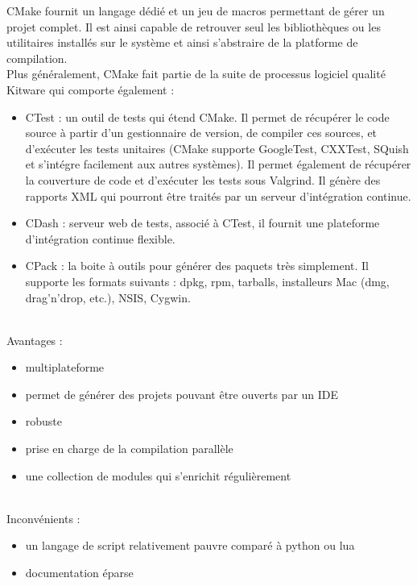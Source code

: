 \documentclass[11pt,twoside,a4paper]{article}
\begin{document}
CMake fournit un langage d{\'e}di{\'e} et un jeu de macros permettant de g{\'e}rer un projet complet. Il est ainsi capable de retrouver seul les biblioth{\`e}ques ou les utilitaires install{\'e}s sur le syst{\`e}me et ainsi s'abstraire de la platforme de compilation.~\\

Plus g{\'e}n{\'e}ralement, CMake fait partie de la suite de processus logiciel qualit{\'e} Kitware qui comporte {\'e}galement :
\begin{itemize}
	\item CTest : un outil de tests qui {\'e}tend CMake. Il permet de r{\'e}cup{\'e}rer le code source {\`a} partir d'un gestionnaire de version, de compiler ces sources, et d'ex{\'e}cuter les tests unitaires (CMake supporte GoogleTest, CXXTest, SQuish et s'int{\'e}gre facilement aux autres syst{\`e}mes). Il permet {\'e}galement de r{\'e}cup{\'e}rer la couverture de code et d'ex{\'e}cuter les tests sous Valgrind. Il g{\'e}n{\`e}re des rapports XML qui pourront {\^e}tre trait{\'e}s par un serveur d'int{\'e}gration continue.
	\item CDash : serveur web de tests, associ{\'e} {\`a} CTest, il fournit une plateforme d'int{\'e}gration continue flexible.
	\item CPack : la boite {\`a} outils pour g{\'e}n{\'e}rer des paquets tr{\`e}s simplement. Il supporte les formats suivants : dpkg, rpm, tarballs, installeurs Mac (dmg, drag'n'drop, etc.), NSIS, Cygwin.
\end{itemize}~\\

Avantages :
\begin{itemize}
	\item multiplateforme
	\item permet de g{\'e}n{\'e}rer des projets pouvant {\^e}tre ouverts par un IDE
	\item robuste
	\item prise en charge de la compilation parall{\`e}le
	\item une collection de modules qui s'enrichit r{\'e}guli{\`e}rement
\end{itemize}~\\

Inconv{\'e}nients :
\begin{itemize}
	\item un langage de script relativement pauvre compar{\'e} {\`a} python ou lua
	\item documentation {\'e}parse
\end{itemize}~\\
\end{document}
